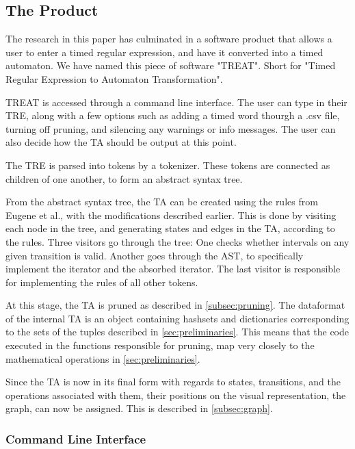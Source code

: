 \subsection{The Product}\label{subsec:theProduct}
The research in this paper has culminated in a software product that allows a user to enter a timed regular expression, and have it converted into a timed automaton.
We have named this piece of software "TREAT". Short for "Timed Regular Expression to Automaton Transformation".

TREAT is accessed through a command line interface. The user can type in their TRE, along with a few options such as adding a timed word thourgh a .csv file, turning off pruning, and silencing any warnings or info messages.
The user can also decide how the TA should be output at this point.

The TRE is parsed into tokens by a tokenizer. These tokens are connected as children of one another, to form an abstract syntax tree. 

From the abstract syntax tree, the TA can be created using the rules from Eugene et al., with the modifications described earlier. %
This is done by visiting each node in the tree, and generating states and edges in the TA, according to the rules. Three visitors go through the tree: One checks whether intervals on any given transition is valid. Another goes through the AST, to specifically implement the iterator and the absorbed iterator. The last visitor is responsible for implementing the rules of all other tokens.

At this stage, the TA is pruned as described in \cref{subsec:pruning}. 
The dataformat of the internal TA is an object containing hashsets and dictionaries corresponding to the sets of the tuples described in \cref{sec:preliminaries}. 
This means that the code executed in the functions responsible for pruning, map very closely to the mathematical operations in \cref{sec:preliminaries}.

Since the TA is now in its final form with regards to states, transitions, and the operations associated with them, their positions on the visual representation, the graph, can now be assigned. This is described in \cref{subsec:graph}.







\subsubsection{Command Line Interface}

